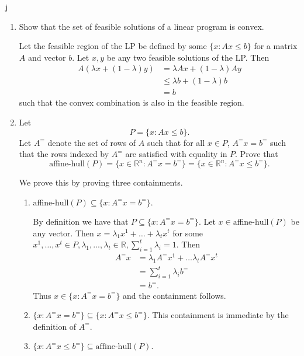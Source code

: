 j\documentclass[11pt]{article}
\newcommand{\setR}{\mathbb{R}}
\renewcommand{\leq}{\leqslant}
\begin{document}
\begin{enumerate}[1)]
\begin{solution}
  \end{solution}
  
  
\item Show that the set of feasible solutions  of a linear program  is
  convex. \label{conv:item:1}
  
  \begin{solution}
  Let the feasible region of the LP be defined by some $\{x : Ax\leq b\}$ for a matrix $A$ and vector $b$. Let $x, y$ be any two feasible solutions of the LP. Then 
  \begin{align*}
  A(\lambda x + (1 - \lambda)y) & = \lambda Ax + (1- \lambda)Ay \\
  & \leq \lambda b + (1 - \lambda)b \\
  & = b
  \end{align*}
  such that the convex combination is also in the feasible region. 
  
  
  \end{solution}
  
  \item Let $$P= \{x: Ax≤b\}.$$ 
  Let $A^=$ denote the set of rows of $A$ such that for all $x \in P$, $A^= x = b^=$ such that the rows indexed by $A^=$ are satisfied with equality in $P$. 
  Prove that 
$$\text{aﬃne-hull}(P) = \{x∈\setR^n : A^=
x= b^=\}= \{x∈\setR^n : A^=
x≤b^=\}.$$


\begin{solution}
We prove this by proving three containments.
\begin{enumerate}
\item $\text{aﬃne-hull}(P) ⊆
\{x: A^=
x= b^=\}.$ 


By definition we have that $P ⊆\{x: A^=
x= b^=\}$. Let $x∈\text{aﬃne-hull}(P)$ be any vector. Then $x= λ_1x^1 +\hdots+ λ_tx^t$ for some $x^1,\hdots,x^t ∈P, λ_1,...,λ_t ∈\setR, \sum_{i=1}^t λ_i = 1$. 
Then 
\begin{align*}
A^=x & = \lambda_1 A^= x^1 + \hdots \lambda_t A^= x^t \\
& = \displaystyle\sum_{i =1}^t\lambda_i b^= \\
& = b^=.
\end{align*}
Thus $x \in \{x : A^= x = b^=\}$ and the containment follows.

\item $\{x : A^= x = b^=\} \subseteq \{x : A^= x \leq b^=\}$. This containment is immediate by the definition of $A^=$. 

\item $\{x : A^= x \leq b^=\} \subseteq \text{affine-hull}(P)$. 



\end{enumerate}
\end{solution}
\end{enumerate}
\end{document}
